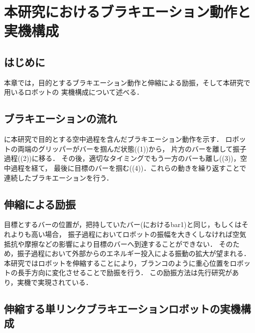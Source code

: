 \chapter[本研究におけるブラキエーション動作と実機構成]%
        {本研究におけるブラキエーション動作と実機構成}
        \section{はじめに}
          
          本章では，目的とするブラキエーション動作と伸縮による励振，そして本研究で用いるロボットの
          実機構成について述べる．


        \section{ブラキエーションの流れ}

          に本研究で目的とする空中過程を含んだブラキエーション動作を示す．
          ロボットの両端のグリッパーがバーを掴んだ状態((1))から，
          片方のバーを離して振子過程((2))に移る．
          その後，適切なタイミングでもう一方のバーも離し((3))，空中過程を経て，
          最後に目標のバーを掴む((4))．これらの動きを繰り返すことで連続したブラキエーションを行う．

        \section{伸縮による励振}
          
          目標とするバーの位置が，把持していたバー(におけるbar1)と同じ，もしくはそれよりも高い場合，
          振子過程においてロボットの振幅を大きくしなければ空気抵抗や摩擦などの影響により目標のバーへ到達することができない．
          そのため，振子過程において外部からのエネルギー投入による振動の拡大が望まれる．
          本研究ではロボットを伸縮することにより，ブランコのように重心位置をロボットの長手方向に変化させることで励振を行う．
          この励振方法は先行研究があり，実機で実現されている\cite{Hijiri:Robomech2024}．
          

        
        \section{伸縮する単リンクブラキエーションロボットの実機構成}
          
